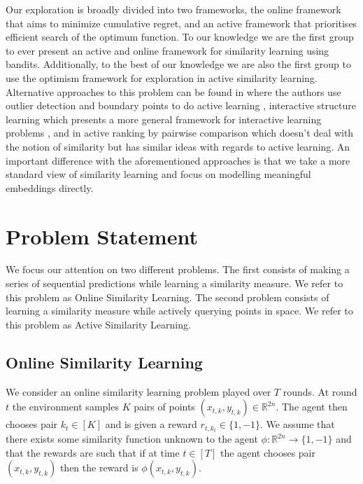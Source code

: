 \documentclass{article}
\begin{document}
Our exploration is broadly divided into two frameworks, the online framework that aims to minimize cumulative regret, and an active framework that prioritises efficient search of the optimum function.
To our knowledge we are the first group to ever present an active and online framework for similarity learning using bandits.
Additionally, to the best of our knowledge we are also the first group to use the optimism framework for exploration in active similarity learning.
Alternative approaches to this problem can be found in \cite{active-learning} where the authors use outlier detection and boundary points to do active learning
, interactive structure learning \cite{SQBC} which presents a more general framework for interactive learning problems
, and in  active ranking by pairwise comparison \cite{ranking} which doesn't deal with the notion of similarity but has similar ideas with regards to active learning.
An important difference with the aforementioned approaches is that we take a more standard view of similarity learning and focus on modelling meaningful embeddings directly.


\section{Problem Statement}
\label{problem-statement}
We focus our attention on two different problems.
The first consists of making a series of sequential predictions while learning a
similarity measure. We refer to this problem as Online Similarity Learning.
The second problem consists of learning a similarity measure while actively querying points in space.
We refer to this problem as Active Similarity Learning.

\subsection{Online Similarity Learning}
\label{problem-statement:online-similarity-learning}
We consider an online similarity learning problem played over $T$ rounds.
At round $t$ the environment samples $K$ pairs of points $(x_{t,k}, y_{t,k}) \in \mathbb{R}^{2n}$.
The agent then chooses pair $k_t \in [K]$ and is given a reward $r_{t,k_{t}} \in \{1, -1\}$.
We assume that there exists some similarity function unknown to the agent $\phi: \mathbb{R}^{2n} \to \{1, -1\}$
and that the rewards are such that if at time $t \in [T]$ the agent chooses pair $(x_{t,k}, y_{t,k})$
then the reward is $\phi(x_{t,k}, y_{t,k})$.
\end{document}
